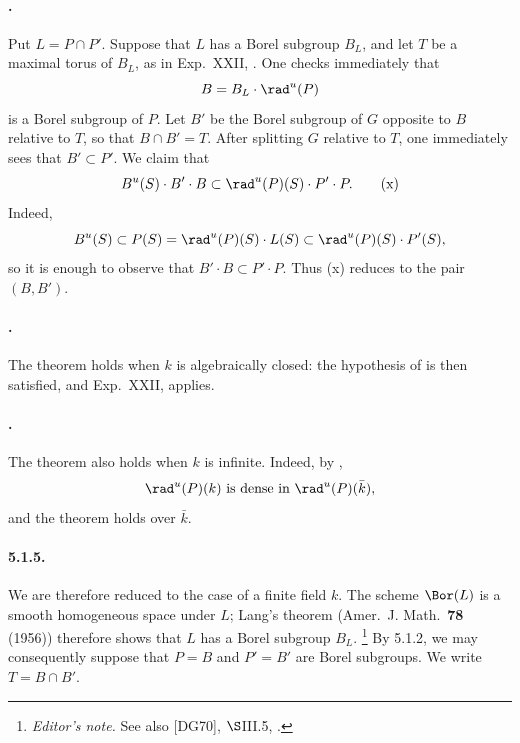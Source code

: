 \paragraph{.}
Put \(L=P\cap P'\).  Suppose that \(L\) has a Borel subgroup \(B_L\),
and let \(T\) be a maximal torus of \(B_L\), as in Exp.\ XXII, .
One checks immediately that
\[
 B=B_L\cdot\rad^u(P)
\]
is a Borel subgroup of \(P\).  Let \(B'\) be the Borel subgroup of
\(G\) opposite to \(B\) relative to \(T\), so that \(B\cap B'=T\).
After splitting \(G\) relative to \(T\), one immediately sees that
\(B'\subset P'\).  We claim that
\[
 B^u(S)\cdot B'\cdot B
 \subset \rad^u(P)(S)\cdot P'\cdot P.                 \tag{x}\label{sga3:xxvi:theorem:5-1:equation:x}
\]
Indeed,
\[
 B^u(S)\subset P(S)
 =\rad^u(P)(S)\cdot L(S)
 \subset\rad^u(P)(S)\cdot P'(S),
\]
so it is enough to observe that \(B'\cdot B\subset P'\cdot P\).
Thus \textup{(x)} reduces  to the pair \((B,B')\).

\paragraph{.}
The theorem holds when \(k\) is algebraically closed: the hypothesis
of  is then satisfied, and Exp.\ XXII,  applies.

\paragraph{.}
The theorem also holds when \(k\) is infinite.  Indeed, by ,
\[
 \rad^u(P)(k)\ \text{is dense in}\ \rad^u(P)(\bar k),
\]
and the theorem holds over \(\bar k\).

\paragraph{5.1.5.}
We are therefore reduced to the case of a finite field \(k\).
The scheme \(\Bor(L)\) is a smooth homogeneous space under \(L\);
Lang's theorem \textup{(Amer.\ J. Math.\ \textbf{78} \textup{(1956)})}
therefore shows that \(L\) has a Borel subgroup \(B_L\).
\footnote{\emph{Editor's note.} See also \textup{[DG70]},
\(\S\)III.5, .}
By 5.1.2, we may consequently suppose that \(P=B\) and \(P'=B'\)
are Borel subgroups.  We write \(T=B\cap B'\).

